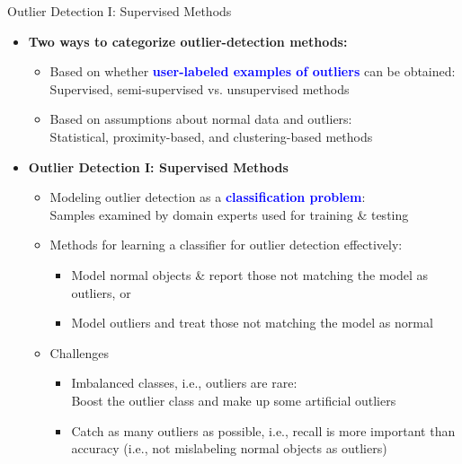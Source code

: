 \documentclass[aspectratio=169,t,xcolor=dvipsnames]{beamer}
\newcommand{\blue}[1]{\textbf{\textcolor{blue}{#1}}}
\begin{document}
%

\begin{frame}{Outlier Detection I: Supervised Methods}
    \begin{itemize}
        \item \textbf{Two ways to categorize outlier-detection methods:} 
        \begin{itemize}
            \item Based on whether \blue{user-labeled examples of outliers} can be obtained:\\ \qquad 
            Supervised, semi-supervised vs. unsupervised methods
            \item Based on assumptions about normal data and outliers:\\ \qquad
            Statistical, proximity-based, and clustering-based methods
        
        \end{itemize}
        \item \textbf{Outlier Detection I: Supervised Methods}
  
        \begin{itemize}
            \item Modeling outlier detection as a \blue{classification problem}:\\ \qquad
            Samples examined by domain experts used for training \& testing
            \item Methods for learning a classifier for outlier detection effectively:
            \begin{itemize}
            \item Model normal objects \& report those not matching the model as outliers, or
            \item Model outliers and treat those not matching the model as normal 
            \end{itemize}
            \item Challenges
            \begin{itemize}
                \item Imbalanced classes, i.e., outliers are rare: \\ \qquad Boost the outlier class and make up some artificial outliers
                \item Catch as many outliers as possible, i.e., recall is more important than accuracy (i.e., not mislabeling normal objects as outliers)
                \end{itemize}
            \end{itemize}
    \end{itemize}
\end{frame}
\end{document}
